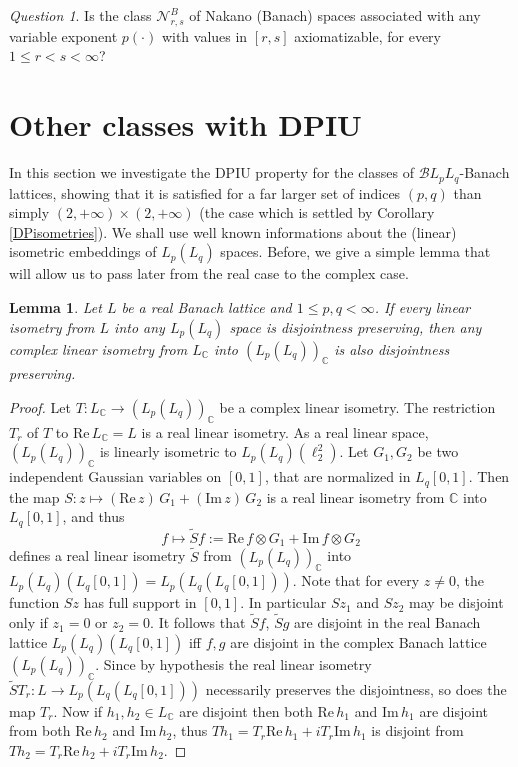 \documentclass[11pt]{amsart}
\theoremstyle{plain}
\newtheorem{lemma}[theorem]{Lemma}
\theoremstyle{remark}
\newtheorem{question}[theorem]{Question}
\renewcommand{\Re}{\mathrm {Re\,}}
\renewcommand{\Im}{\mathrm {Im\,}}
\begin{document}
\begin{question}
 Is the class $\mathcal N_{r,s}^B$ of Nakano (Banach) spaces associated with any variable exponent $p(\cdot)$ with values in $[r,s]$ axiomatizable, for every $1\le r< s<\infty$? 
\end{question}

\section{Other classes with DPIU}\label{sec:other}

In this section we investigate the DPIU property for the classes of $\mathcal BL_pL_q$-Banach lattices, showing that it is satisfied  for a far larger set of indices $(p,q)$ than simply $(2,+\infty)\times (2,+\infty)$ (the case which is settled by Corollary \ref{DPisometries}). We shall use well known informations about the (linear) isometric embeddings of $L_p(L_q)$ spaces. Before, we give a simple lemma that will allow us to pass later from the real case to the complex case.

\begin{lemma}\label{re-dp-implies-comp-dp}
Let $L$ be a real Banach lattice and $1\le p,q<\infty$. If every linear isometry from $L$ into any $L_p(L_q)$ space is disjointness preserving, then any complex linear isometry from $L_\mathbb C$ into $(L_p(L_q))_\mathbb C$ is also disjointness preserving.
\end{lemma}

\begin{proof}
Let $T: L_\mathbb C \to (L_p(L_q))_\mathbb C$ be a complex linear isometry. The restriction $T_r$ of $T$ to $\Re L_\mathbb C = L$ is a real linear isometry. As a real linear space, $(L_p(L_q))_\mathbb C$ is linearly isometric to $L_p(L_q)(\ell_2^2)$. Let $G_1,G_2$ be two independent Gaussian variables on $[0,1]$, that are normalized in $L_q[0,1]$. Then the map $S: z\mapsto (\Re z) \,G_1+ (\Im z)\, G_2$ is a real linear isometry from $\mathbb C$ into $L_q[0,1]$, and thus
\[ f\mapsto \widetilde Sf:=\Re f\otimes G_1+\Im f\otimes G_2\] 
defines a real linear isometry $\widetilde S$ from $(L_p(L_q))_\mathbb C$ into $L_p(L_q)(L_q[0,1])=L_p(L_q(L_q[0,1]))$. Note that for every $z\ne 0$, the function $Sz$ has full support in $[0,1]$. In particular $Sz_1$ and $Sz_2$ may be disjoint only if $z_1=0$ or $z_2=0$. It follows that $\widetilde Sf$, $\widetilde Sg$ are disjoint in the real Banach lattice $L_p(L_q)(L_q[0,1])$ iff $f,g$ are disjoint in the complex Banach lattice $(L_p(L_q))_\mathbb C$. Since by hypothesis the real linear isometry $\widetilde ST_r: L\to L_p(L_q(L_q[0,1]))$ necessarily preserves the disjointness, so does the map $T_r$. Now if $h_1,h_2\in L_\mathbb C$ are disjoint then both $\Re h_1$ and $\Im h_1$ are disjoint from both $\Re h_2$ and $\Im h_2$, thus $Th_1=T_r\Re h_1+iT_r \Im h_1$ is disjoint from $Th_2=T_r\Re h_2+iT_r \Im h_2$.
\end{proof}
\end{document}
